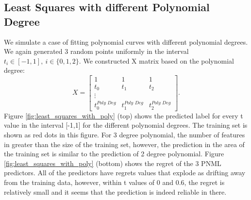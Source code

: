 \documentclass[conference,letterpaper]{IEEEtran}
\begin{document}
\subsection{Least Squares with different Polynomial Degree} \label{sec:least_sqaures_with_pol_deg}
We simulate a case of fitting polynomial curves with different polynomial degrees. We again generated 3 random points uniformly in the interval $t_i \in [-1, 1],\ i \in \{0,1,2\}$.
We constructed X matrix based on the polynomial degree:
\begin{equation}
X = 
\begin{bmatrix}
1 & 1 & 1 \\
t_0 & t_1 & t_2 \\
\vdots \\
t_0^{\textit{Poly Deg}} & t_1^{\textit{Poly Deg}} & t_2^{\textit{Poly Deg}} 
\end{bmatrix}.
\end{equation}
Figure \ref{fig:least_squares_with_poly} (top) shows the predicted label for every t value in the interval [-1,1] for the different polynomial degrees. The training set is shown as red dots in this figure. 
For 3 degree polynomial, the number of features in greater than the size of the training set, however, the prediction in the area of the training set is similar to the prediction of 2 degree polynomial.
Figure \ref{fig:least_squares_with_poly} (bottom) shows the regret of the 3 PNML predictors. All of the predictors have regrets values that explode as drifting away from the training data, however, within t values of 0 and 0.6, the regret is relatively small and it seems that the prediction is indeed reliable in there.
\end{document}
